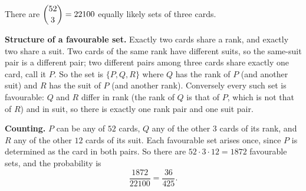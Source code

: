 There are $\dbinom{52}{3}=22100$ equally likely sets of three cards.

\textbf{Structure of a favourable set.} Exactly two cards share a rank, and exactly two share a suit. Two cards of the same rank have different suits, so the same-suit pair is a different pair; two different pairs among three cards share exactly one card, call it $P$. So the set is $\{P,Q,R\}$ where $Q$ has the rank of $P$ (and another suit) and $R$ has the suit of $P$ (and another rank). Conversely every such set is favourable: $Q$ and $R$ differ in rank (the rank of $Q$ is that of $P$, which is not that of $R$) and in suit, so there is exactly one rank pair and one suit pair.

\textbf{Counting.} $P$ can be any of $52$ cards, $Q$ any of the other $3$ cards of its rank, and $R$ any of the other $12$ cards of its suit. Each favourable set arises once, since $P$ is determined as the card in both pairs. So there are $52\cdot3\cdot12=1872$ favourable sets, and the probability is
\[\dfrac{1872}{22100}=\boxed{\dfrac{36}{425}}.\]
